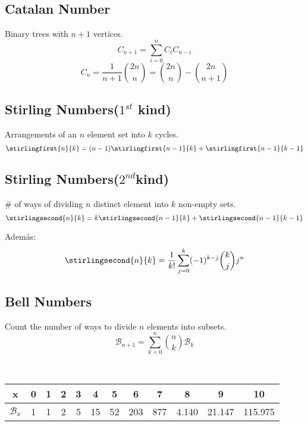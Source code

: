     \subsection{Catalan Number}
    	Binary trees with $n+1$ vertices.
      \begin{equation*}
        C_{n+1} = \sum_{i=0}^nC_iC_{n-i}
      \end{equation*}
      \begin{equation*}
        C_n = \frac{1}{n+1}\binom{2n}{n} = \binom{2n}{n} - \binom{2n}{n+1}
      \end{equation*}
    \subsection{Stirling Numbers($1^{st}$ kind)} Arrangements of an $n$ element set into $k$ cycles.
      \begin{equation*}
        \stirlingfirst{n}{k} = (n-1)\stirlingfirst{n-1}{k} + \stirlingfirst{n-1}{k-1}
      \end{equation*}

    \subsection{Stirling Numbers($2^{nd}$kind)} \# of ways of dividing $n$ distinct element into $k$ non-empty sets.
      \begin{equation*}
        \stirlingsecond{n}{k} = k\stirlingsecond{n-1}{k} + \stirlingsecond{n-1}{k-1}
      \end{equation*}

      Además:
      \begin{equation*}
        \stirlingsecond{n}{k} = \frac{1}{k!}\sum_{j=0}^k (-1)^{k-j} \binom{k}{j} j^n
      \end{equation*}

      \subsection{Bell Numbers} Count the number of ways to divide $n$ elements into subsets.
      \begin{equation*}
        \mathcal{B}_{n+1} = \sum_{k=0}^n \binom{n}{k} \mathcal{B}_k
      \end{equation*}

      \

      \begin{tabular}{|c|c|c|c|c|c|c|c|c|c|c|c|}
        \hline
        x&0&1&2&3&4&5&6&7&8&9&10 \\ \hline %
        $\mathcal{B}_x$&1&1&2&5&15&52&203&877&4.140&21.147&115.975 \\ \hline %
      \end{tabular}

